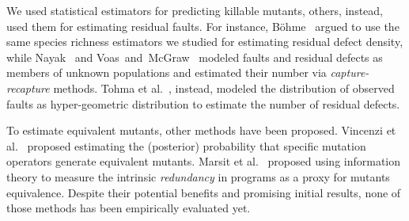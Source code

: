 \documentclass[sigconf,review,anonymous]{acmart}
\newcounter{todocounter}
\newcommand{\todo}[1]{\marginpar{$|$}\textcolor{red}{\stepcounter{todocounter}\footnote[\thetodocounter]{\textcolor{red}{\textbf{TODO }}\textit{#1}}}}
\renewcommand{\todo}[1]{}
\begin{document}
We used statistical estimators for predicting killable mutants, others, instead, used
them for estimating residual faults.
%
For instance, B{\"o}hme~\cite{bohme2018stads} argued to use the same
species richness estimators we studied for estimating residual defect density,
while Nayak~\cite{nayak1988estimating} and Voas~and~McGraw~\cite{voas1997software}
modeled faults and 
residual defects as members of unknown populations
and estimated their number via \emph{capture-recapture} methods.
%
%
%
%
Tohma et al.~\cite{tohma1989structural}, instead, modeled
the distribution of observed faults as hyper-geometric distribution
to estimate the number of residual defects.

To estimate equivalent mutants, other methods
have been proposed.
%
Vincenzi et al.~\cite{vincenzi2002bayesian} proposed
estimating the (posterior) probability that specific mutation operators
generate equivalent mutants.
%
Marsit et al.~\cite{marsit2017estimating,marsit2018impact,ayad2019estimating}
proposed using information theory %
to measure the intrinsic \emph{redundancy} in programs as a proxy for mutants equivalence. 
Despite their potential benefits and promising initial results,
none of those methods has been empirically evaluated yet.

\end{document}
